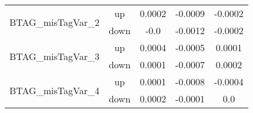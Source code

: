 \begin{table}[h!]
\begin{tabular}{lcccc}
\multirow{2}{*}{BTAG\_misTagVar\_2}      & up   &     0.0002     &     -0.0009     &     -0.0002      \\
                                       & down &     -0.0     &     -0.0012     &     -0.0002       \\ \hline
\multirow{2}{*}{BTAG\_misTagVar\_3}      & up   &     0.0004     &     -0.0005     &     0.0001      \\
                                       & down &     0.0001     &     -0.0007     &     0.0002       \\ \hline
\multirow{2}{*}{BTAG\_misTagVar\_4}      & up   &     0.0001     &     -0.0008     &     -0.0004      \\
                                       & down &     0.0002     &     -0.0001     &     0.0       \\ \hline

\end{tabular}

\label{tab:systUnc_lep_f0}
\end{table}


